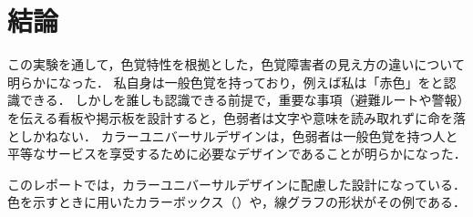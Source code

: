 \section{結論}
この実験を通して，色覚特性を根拠とした，色覚障害者の見え方の違いについて明らかになった．
私自身は一般色覚を持っており，例えば私は「赤色」をと認識できる．
しかしを誰しも認識できる前提で，重要な事項（避難ルートや警報）を伝える看板や掲示板を設計すると，色弱者は文字や意味を読み取れずに命を落としかねない．
カラーユニバーサルデザインは，色弱者は一般色覚を持つ人と平等なサービスを享受するために必要なデザインであることが明らかになった．\par
このレポートでは，カラーユニバーサルデザインに配慮した設計になっている．色を示すときに用いたカラーボックス（）や，線グラフの形状がその例である．